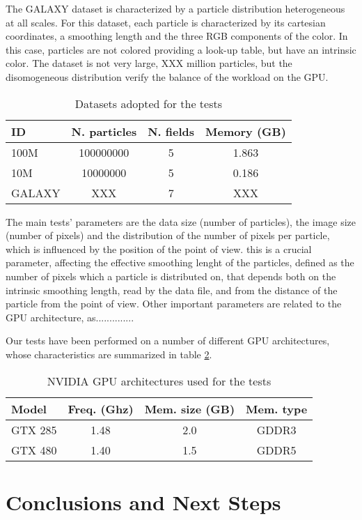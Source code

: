 \documentclass[11pt]{article}
\begin{document}
The GALAXY dataset is characterized by a particle distribution 
heterogeneous at all scales. For this dataset, each particle is characterized by its 
cartesian coordinates, a smoothing length and the three RGB components of the color. 
In this case, particles are not colored providing a look-up table,
but have an intrinsic color. The dataset is not very large, XXX million 
particles, but the disomogeneous distribution verify the balance 
of the workload on the GPU.

\begin{table}
\caption{Datasets adopted for the tests}
\centering 
\begin{tabular}{l c c c} 
\hline\hline 
ID & N. particles & N. fields & Memory (GB) \\ [0.5ex] 
\hline %
100M   & 100000000 & 5 & 1.863 \\ 
10M    & 10000000  & 5 & 0.186 \\
GALAXY & XXX & 7 & XXX \\
\hline 
\end{tabular}
\label{table:tests}
\end{table}

The main tests' parameters are the data size (number of particles),
the image size (number of pixels) and the distribution of the number of pixels 
per particle, which is influenced by the position of the point of view.
this is a crucial parameter, affecting the effective smoothing lenght of the particles,
defined as the number of pixels which a particle is distributed on, that 
depends both on the intrinsic smoothing length, read by the data file, and 
from the distance of the particle from the point of view. Other important parameters
are related to the GPU architecture, as..............

Our tests have been performed on a number of different GPU architectures, 
whose characteristics are summarized in table \ref{table:gpus}. 

\begin{table}
\caption{NVIDIA GPU architectures used for the tests}
\centering
\begin{tabular}{l c c c}
\hline\hline
Model & Freq. (Ghz) & Mem. size (GB) & Mem. type \\ [0.5ex]
\hline %
GTX 285   & 1.48 & 2.0 & GDDR3 \\
GTX 480   & 1.40 & 1.5 & GDDR5 \\
\hline
\end{tabular}
\label{table:gpus}
\end{table}
 


\section{Conclusions and Next Steps}
\end{document}
